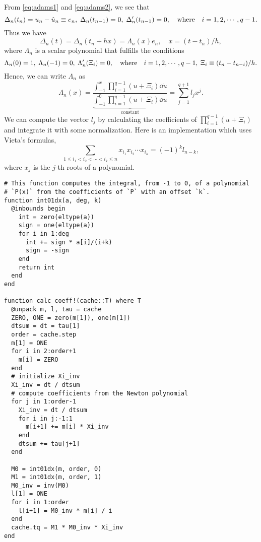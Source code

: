 \documentclass[11pt,a4paper]{article}
\begin{document}
From \cref{eq:adams1} and \cref{eq:adams2}, we see that
\begin{equation}
  \Delta_n(t_n) = u_n - \hat{u}_n \equiv e_n,\; \Delta_n(t_{n-1}) = 0,\;
  \Delta'_n(t_{n-1}) = 0, \qq{where} i=1,2,\cdots,q-1.
\end{equation}
Thus we have
\begin{equation}
  \Delta_n(t) = \Delta_n(t_n+hx) = \Lambda_n(x)e_n, \quad x = (t-t_n)/h,
\end{equation}
where $\Lambda_n$ is a scalar polynomial that fulfills the conditions
\begin{equation}
  \Lambda_n(0)=1,\; \Lambda_n(-1) = 0,\; \Lambda'_n(\Xi_i) = 0,\qq{where}
  i=1,2,\cdots,q-1,\; \Xi_i \equiv (t_n-t_{n-i})/h.
\end{equation}
Hence, we can write $\Lambda_n$ as
\begin{equation}
  \Lambda_n(x) = \frac{\int_{-1}^x\prod_{i=1}^{q-1} (u+\Xi_i) \dd{u}}
          {\underbrace{\int_{-1}^0\prod_{i=1}^{q-1} (u+\Xi_i)
          \dd{u}}_\text{constant}}
               = \sum_{j=1}^{q+1} l_jx^j.
\end{equation}
We can compute the vector $l_j$ by calculating the coefficients of
$\prod_{i=1}^{q-1} (u+\Xi_i)$ and integrate it with some normalization. Here is
an implementation which uses Vieta's formulas,
\begin{equation}
  \sum_{1\leq i_{1}<i_{2}<\cdots <i_{k}\leq n}x_{i_{1}}x_{i_{2}}\cdots
  x_{i_{k}}=(-1)^{k}l_{n-k},
\end{equation}
where $x_j$ is the $j$-th roots of a polynomial.
\begin{lstlisting}
# This function computes the integral, from -1 to 0, of a polynomial
# `P(x)` from the coefficients of `P` with an offset `k`.
function int01dx(a, deg, k)
  @inbounds begin
    int = zero(eltype(a))
    sign = one(eltype(a))
    for i in 1:deg
      int += sign * a[i]/(i+k)
      sign = -sign
    end
    return int
  end
end

function calc_coeff!(cache::T) where T
  @unpack m, l, tau = cache
  ZERO, ONE = zero(m[1]), one(m[1])
  dtsum = dt = tau[1]
  order = cache.step
  m[1] = ONE
  for i in 2:order+1
    m[i] = ZERO
  end
  # initialize Xi_inv
  Xi_inv = dt / dtsum
  # compute coefficients from the Newton polynomial
  for j in 1:order-1
    Xi_inv = dt / dtsum
    for i in j:-1:1
      m[i+1] += m[i] * Xi_inv
    end
    dtsum += tau[j+1]
  end

  M0 = int01dx(m, order, 0)
  M1 = int01dx(m, order, 1)
  M0_inv = inv(M0)
  l[1] = ONE
  for i in 1:order
    l[i+1] = M0_inv * m[i] / i
  end
  cache.tq = M1 * M0_inv * Xi_inv
end
\end{lstlisting}
\end{document}
